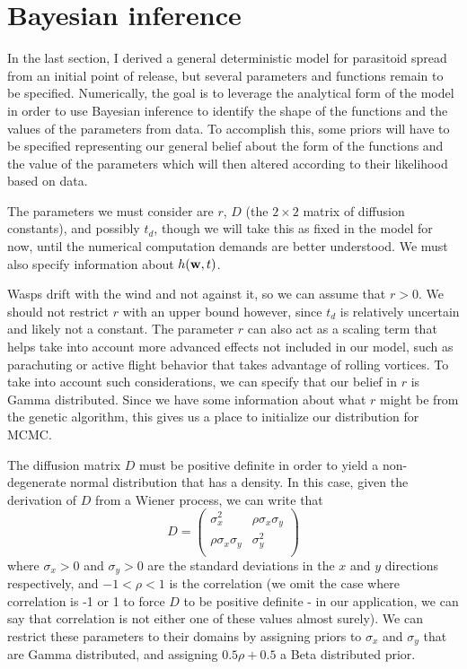 \documentclass[12pt,english]{article}
\begin{document}
\section*{Bayesian inference}

In the last section, I derived a general deterministic model for parasitoid spread from an initial point of release, but several parameters and functions remain to be specified. Numerically, the goal is to leverage the analytical form of the model in order to use Bayesian inference to identify the shape of the functions and the values of the parameters from data. To accomplish this, some priors will have to be specified representing our general belief about the form of the functions and the value of the parameters which will then altered according to their likelihood based on data.

The parameters we must consider are $r$, $D$ (the $2\times 2$ matrix of diffusion constants), and possibly $t_d$, though we will take this as fixed in the model for now, until the numerical computation demands are better understood. We must also specify information about $h(\mathbf{w},t)$.

Wasps drift with the wind and not against it, so we can assume that $r>0$. We should not restrict $r$ with an upper bound however, since $t_d$ is relatively uncertain and likely not a constant. The parameter $r$ can also act as a scaling term that helps take into account more advanced effects not included in our model, such as parachuting or active flight behavior that takes advantage of rolling vortices. To take into account such considerations, we can specify that our belief in $r$ is Gamma distributed. Since we have some information about what $r$ might be from the genetic algorithm, this gives us a place to initialize our distribution for MCMC.

The diffusion matrix $D$ must be positive definite in order to yield a non-degenerate normal distribution that has a density. In this case, given the derivation of $D$ from a Wiener process, we can write that
\begin{equation*}
D = \left(
      \begin{array}{cc}
        \sigma_x^2 & \rho\sigma_x\sigma_y \\
        \rho\sigma_x\sigma_y & \sigma_y^2 \\
      \end{array}
    \right)
\end{equation*}
where $\sigma_x>0$ and $\sigma_y>0$ are the standard deviations in the $x$ and $y$ directions respectively, and $-1<\rho<1$ is the correlation (we omit the case where correlation is -1 or 1 to force $D$ to be positive definite - in our application, we can say that correlation is not either one of these values almost surely). We can restrict these parameters to their domains by assigning priors to $\sigma_x$ and $\sigma_y$ that are Gamma distributed, and assigning $0.5\rho+0.5$ a Beta distributed prior.
\end{document}
